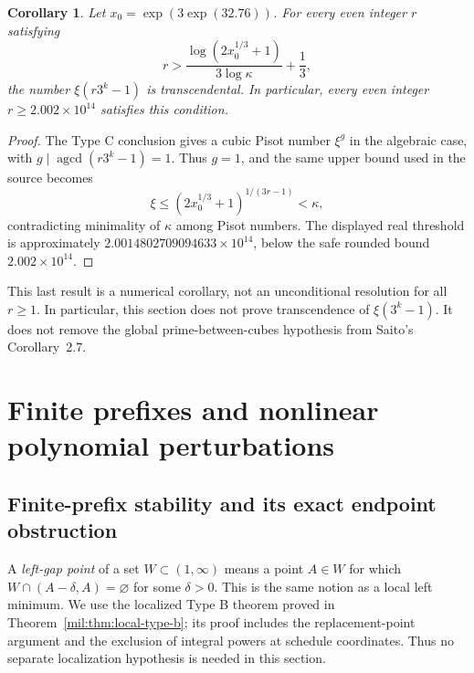 \documentclass[11pt,a4paper]{article}
\newtheorem{corollary}[theorem]{Corollary}
\theoremstyle{definition}
\theoremstyle{remark}
\numberwithin{equation}{section}
\begin{document}
\begin{corollary}\label{mil:cor:ac-even}
Let $x_0=\exp(3\exp(32.76))$. For every even integer $r$ satisfying
\[
 r>\frac{\log(2x_0^{1/3}+1)}{3\log\kappa}+\frac13,
\]
the number $\xi(r3^k-1)$ is transcendental. In particular, every
even integer $r\ge2.002\times10^{14}$ satisfies this condition.
\end{corollary}
\begin{proof}
The Type C conclusion gives a cubic Pisot number $\xi^g$ in
the algebraic case, with $g\mid\operatorname{agcd}(r3^k-1)=1$.
Thus $g=1$, and the same upper bound used in the source becomes
\[
 \xi\le(2x_0^{1/3}+1)^{1/(3r-1)}<\kappa,
\]
contradicting minimality of $\kappa$ among Pisot numbers.
The displayed real threshold is approximately
$2.0014802709094633\times10^{14}$, below the safe rounded bound
$2.002\times10^{14}$.
\end{proof}

This last result is a numerical corollary, not an unconditional
resolution for all $r\ge1$. In particular, this section does not
prove transcendence of $\xi(3^k-1)$. It does not remove the
global prime-between-cubes hypothesis from Saito's Corollary~2.7.

\section{Finite prefixes and nonlinear polynomial perturbations}
\label{mil:sec:return-extensions}

\subsection{Finite-prefix stability and its exact endpoint obstruction}
A \emph{left-gap point} of a set $W\subset(1,\infty)$ means a point
$A\in W$ for which $W\cap(A-\delta,A)=\varnothing$ for some $\delta>0$.
This is the same notion as a local left minimum. We use the localized
Type B theorem proved in Theorem~\ref{mil:thm:local-type-b}; its proof includes
the replacement-point argument and the exclusion of integral powers at
schedule coordinates. Thus no separate localization hypothesis is needed
in this section.
\end{document}
